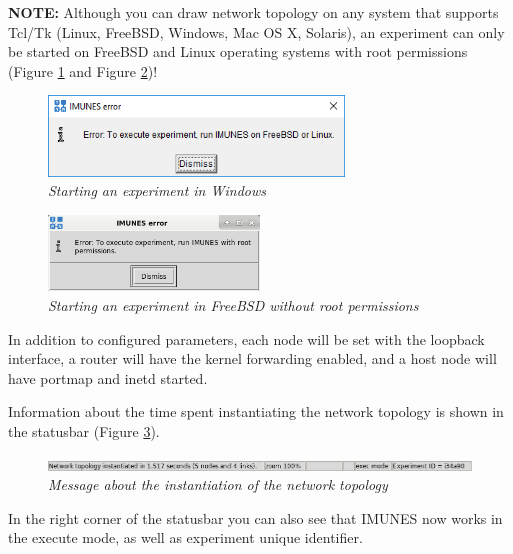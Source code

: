\textbf{NOTE:} Although you can draw network topology on any system that
supports Tcl/Tk (Linux, FreeBSD, Windows, Mac OS X, Solaris), an  experiment
can only be started on FreeBSD and Linux operating systems with root
permissions (Figure \ref{fig:execute_windows} and Figure
\ref{fig:execute_not_root})!

\begin{figure}[H]
\centering
\vspace{10pt}
\includegraphics[width=0.7\textwidth]{./images/execute_windows.png}
\caption{\emph{Starting an experiment in Windows}}
\label{fig:execute_windows}
\end{figure}

\begin{figure}[H]
\centering
\includegraphics[width=0.5\textwidth]{./images/execute_not_root.png}
\caption{\emph{Starting an experiment in FreeBSD without root permissions}}
\label{fig:execute_not_root}
\end{figure}
 
In addition to configured parameters, each node will be set with the loopback
interface, a router will have the kernel forwarding enabled, and a host node
will have portmap and inetd started.

Information about the time spent instantiating the network topology is shown in
the statusbar (Figure \ref{fig:statusbar_execute}).

\begin{figure}[H]
\centering
\vspace{10pt}
\includegraphics[width=\textwidth]{./images/statusbar3.png}
\caption{\emph{Message about the instantiation of the network topology}}
\label{fig:statusbar_execute}
\end{figure}

In the right corner of the statusbar you can also see that IMUNES now works in
the execute mode, as well as experiment unique identifier.

